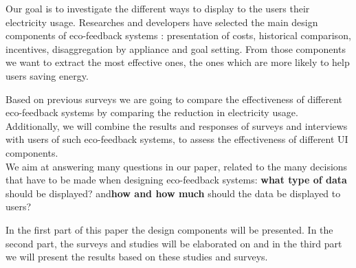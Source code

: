 \documentclass[journal]{vgtc}                %
\begin{document}
Our goal is to investigate the different ways to display to the users their electricity usage.
Researches and developers have selected %
the main design components of eco-feedback systems %
: presentation of costs, historical comparison, incentives, disaggregation by appliance and goal setting. From those components we want to extract the most effective ones, the ones which are more likely to help users saving energy. 


Based on previous surveys we are going to compare the effectiveness of different eco-feedback systems by comparing the reduction in electricity usage. %
Additionally, we will combine the results and responses of surveys and interviews with users of such eco-feedback systems, to assess the effectiveness of different UI components. \\

We aim at answering many questions in our paper, related to the many decisions that have to be made when designing eco-feedback systems: \textbf{what type of data} should be displayed? and\textbf{how and how much} should the data be displayed to users? 

In the first part of this paper the design components will be presented. In the second part, the surveys and studies will be elaborated on and in the third part we will present the results based on these studies and surveys. %


\end{document}
